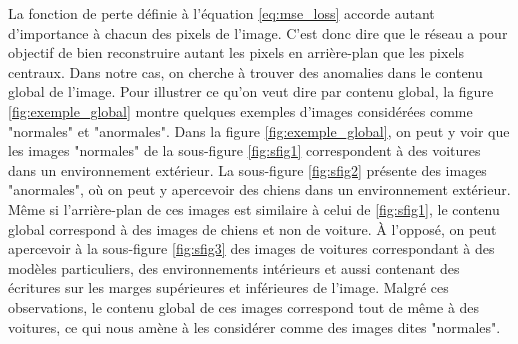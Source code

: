 La fonction de perte définie à l'équation \ref{eq:mse_loss} accorde autant d'importance à chacun des pixels de l'image. C'est donc dire que le réseau a pour objectif de bien reconstruire autant les pixels en arrière-plan que les pixels centraux. Dans notre cas,  on cherche à trouver des anomalies dans le contenu global de l'image. Pour illustrer ce qu'on veut dire par contenu global, la figure \ref{fig:exemple_global} montre quelques exemples d'images considérées comme "normales" et "anormales". Dans la figure \ref{fig:exemple_global}, on peut y voir que les images "normales" de la sous-figure \ref{fig:sfig1} correspondent à des voitures dans un environnement extérieur. La sous-figure \ref{fig:sfig2} présente des images "anormales", où on peut y apercevoir des chiens dans un environnement extérieur. Même si l'arrière-plan de ces images est similaire à celui de \ref{fig:sfig1}, le contenu global correspond à des images de chiens et non de voiture. À l'opposé, on peut apercevoir à la sous-figure \ref{fig:sfig3} des images de voitures correspondant à des modèles particuliers, des environnements intérieurs et aussi contenant des écritures sur les marges supérieures et inférieures de l'image. Malgré ces observations, le contenu global de ces images correspond tout de même à des voitures, ce qui nous amène à les considérer comme des images dites "normales".

